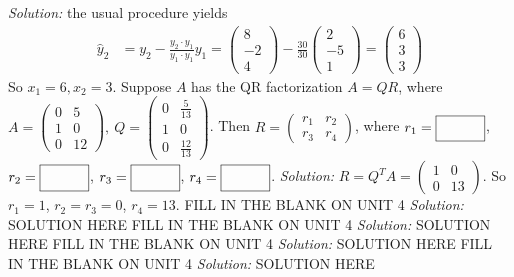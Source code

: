     \ifnum {} {\color{DarkBlue} \textit{Solution:} the usual procedure yields
    \begin{align}
        \hat y_2 
        &= y_2 - \frac{y_2\cdot y_1}{y_1 \cdot y_1}y_1 
        = \begin{pmatrix} 8\\-2\\4\end{pmatrix} - \frac{30}{30}\begin{pmatrix} 2\\-5\\1\end{pmatrix} 
        = \begin{pmatrix} 6\\3\\3\end{pmatrix}
    \end{align}
    So $x_1=6, x_2=3$. 
    } \fi    
\fi 
\ifnum {} %
    Suppose $A$ has the QR factorization $A=QR$, where $A = \begin{pmatrix} 0&5\\1&0\\0&12\end{pmatrix}, \ Q = \begin{pmatrix} 0&\frac{5}{13}\\1&0\\0&\frac{12}{13}\end{pmatrix}$. 
    Then $R=\begin{pmatrix} r_1&r_2\\r_3&r_4\end{pmatrix}$, where 
    $r_1=\framebox{\strut\hspace{1cm}}$, 
    $r_2=\framebox{\strut\hspace{1cm}}$, 
    $r_3=\framebox{\strut\hspace{1cm}}$, 
    $r_4=\framebox{\strut\hspace{1cm}}$.
    \ifnum {} {\color{DarkBlue} \textit{Solution:} $R=Q^TA = \begin{pmatrix} 1&0\\0&13 \end{pmatrix}.$ So $r_1 = 1$, $r_2=r_3=0$, $r_4=13$.  } \fi    
\fi 
\ifnum {} %
    FILL IN THE BLANK ON UNIT 4
    \ifnum {} {\color{DarkBlue} \textit{Solution:} SOLUTION HERE  } \fi    
\fi 
\ifnum {} %
    FILL IN THE BLANK ON UNIT 4
    \ifnum {} {\color{DarkBlue} \textit{Solution:} SOLUTION HERE  } \fi    
\fi 
\ifnum {} %
    FILL IN THE BLANK ON UNIT 4
    \ifnum {} {\color{DarkBlue} \textit{Solution:} SOLUTION HERE  } \fi    
\fi 
\ifnum {} %
    FILL IN THE BLANK ON UNIT 4
    \ifnum {} {\color{DarkBlue} \textit{Solution:} SOLUTION HERE  } \fi    
\fi 

